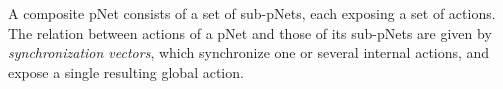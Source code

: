\documentclass{lncs/llncs}
\newcommand{\noteSB}[2][color=green!40, size=\tiny]{\todo[#1]{{\bf
      Note: } {#2}}}
\newcommand{\noteEM}[2][color=blue!40, size=\tiny]{\todo[#1]{{\bf Eric: } {#2}}}
\def\AlgA{\mathcal{A}}
\begin{document}
A composite pNet consists of a set of sub-pNets, each exposing
a set of actions. %
The relation between actions of a pNet and those of its sub-pNets
are given by  \emph{synchronization vectors}, which %
synchronize one or several internal actions, and
expose a single resulting global action.





\end{document}
